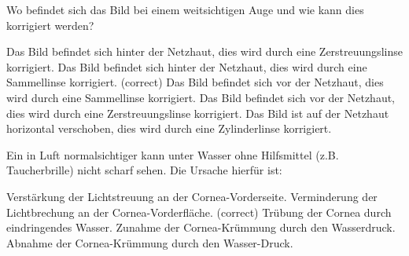 \documentclass[11pt]{exam}
\begin{document}
\begin{questions}
\vspace{3mm}\question Wo befindet sich das Bild bei einem weitsichtigen Auge und wie kann dies korrigiert werden?

\begin{choices}
	\choice Das Bild befindet sich hinter der Netzhaut, dies wird durch eine Zerstreuungslinse korrigiert.
	\choice Das Bild befindet sich hinter der Netzhaut, dies wird durch eine Sammellinse korrigiert. (correct)
	\choice Das Bild befindet sich vor der Netzhaut, dies wird durch eine Sammellinse korrigiert.
	\choice Das Bild befindet sich vor der Netzhaut, dies wird durch eine Zerstreuungslinse korrigiert.
	\choice Das Bild ist auf der Netzhaut horizontal verschoben, dies wird durch eine Zylinderlinse korrigiert.
\end{choices}

\vspace{3mm}\question Ein in Luft normalsichtiger kann unter Wasser ohne Hilfsmittel (z.B. Taucherbrille) nicht scharf sehen. Die Ursache hierfür ist:

\begin{choices}
	\choice Verstärkung der Lichtstreuung an der Cornea-Vorderseite.
	\choice Verminderung der Lichtbrechung an der Cornea-Vorderfläche. (correct)
	\choice Trübung der Cornea durch eindringendes Wasser.
	\choice Zunahme der Cornea-Krümmung durch den Wasserdruck.
	\choice Abnahme der Cornea-Krümmung durch den Wasser-Druck.
\end{choices}

\vspace{3mm}\end{questions}
\end{document}
